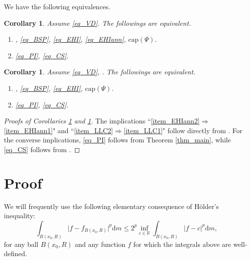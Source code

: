 \documentclass[10pt,a4paper]{amsart}
\numberwithin{equation}{section}
\newtheorem{corollary}[theorem]{Corollary}
\begin{document}
We have the following equivalences.

\begin{corollary}\label{cor_EHIann}
Assume \ref{eq_VD}. The followings are equivalent.
\begin{enumerate}[label=(\arabic*),ref=(\arabic*)]
\item\label{item_EHIann1} \hyperlink{eq_LSC}{}, \ref{eq_BSP}, \ref{eq_EHI}, \ref{eq_EHIann}, \hyperlink{eq_cap}{$\text{cap}(\Psi)$}.
\item\label{item_EHIann2} \ref{eq_PI}, \ref{eq_CS}.
\end{enumerate}
\end{corollary}

\begin{corollary}\label{cor_LLC}
Assume \ref{eq_VD}, \hyperlink{eq_LLC}{}. The followings are equivalent.
\begin{enumerate}[label=(\roman*),ref=(\roman*)]
\item\label{item_LLC1} \hyperlink{eq_LSC}{}, \ref{eq_BSP}, \ref{eq_EHI}, \hyperlink{eq_cap}{$\text{cap}(\Psi)$}.
\item\label{item_LLC2} \ref{eq_PI}, \ref{eq_CS}.
\end{enumerate}
\end{corollary}

\begin{proof}[Proofs of Corollaries \ref{cor_EHIann} and \ref{cor_LLC}]
The implications ``\ref{item_EHIann2}$\Rightarrow$\ref{item_EHIann1}" and ``\ref{item_LLC2}$\Rightarrow$\ref{item_LLC1}" follow directly from \cite[Theorem 2.3]{Yan25d}. For the converse implications, \ref{eq_PI} follows from Theorem \ref{thm_main}, while \ref{eq_CS} follows from \cite[Theorem 2.1]{Yan25d}.
\end{proof}


\section{Proof}\label{sec_proof}

We will frequently use the following elementary consequence of H\"older's inequality:
\begin{equation}\label{eq_ele}
\int_{B(x_0,R)}\lvert f-f_{B(x_0,R)}\rvert^p \mathrm{d}m\le 2^p\inf_{c\in \mathbb{R}}\int_{B(x_0,R)}\lvert f-c\rvert^p \mathrm{d}m,
\end{equation}
for any ball $B(x_0,R)$ and any function $f$ for which the integrals above are well-defined.
\end{document}
